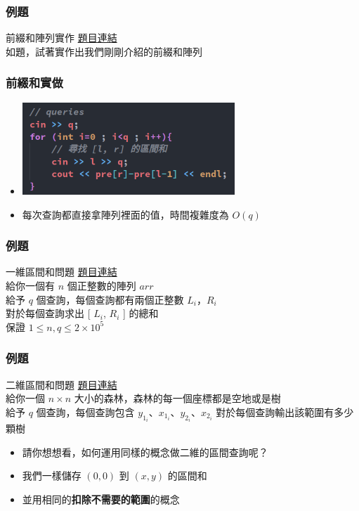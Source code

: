 \documentclass[mathserif]{beamer}
\begin{document}
\begin{frame}
    \frametitle{例題}
    \begin{block}{前綴和陣列實作}
        \href{https://zerojudge.tw/ShowProblem?problemid=e339}{題目連結}\\
        如題，試著實作出我們剛剛介紹的前綴和陣列
    \end{block}
\end{frame}

\begin{frame}
    \frametitle{前綴和實做}
    \begin{itemize}
        \item \includegraphics[width=8.0cm]{img/6-5.png}
        \item 每次查詢都直接拿陣列裡面的值，時間複雜度為 $O(q)$
    \end{itemize}
\end{frame}

\begin{frame}
    \frametitle{例題}
    \begin{block}{一維區間和問題}
        \href{https://cses.fi/problemset/task/1646}{題目連結}\\
        給你一個有 $n$ 個正整數的陣列 $arr$\\
        給予 $q$ 個查詢，每個查詢都有兩個正整數 $L_i$，$R_i$\\
        對於每個查詢求出 [ $L_i$, $R_i$ ] 的總和\\

        保證 $1 \leq n, q \leq 2 \times 10^5$
    \end{block}
\end{frame}

\begin{frame}
    \frametitle{例題}
    \begin{block}{二維區間和問題}
        \href{https://cses.fi/problemset/task/1652}{題目連結}\\
        給你一個 $n \times n$ 大小的森林，森林的每一個座標都是空地或是樹\\
        給予 $q$ 個查詢，每個查詢包含 $y_{1_i}$、$x_{1_i}$、$y_{2_i}$、$x_{2_i}$
        對於每個查詢輸出該範圍有多少顆樹
    \end{block}
    \begin{itemize}
        \item 請你想想看，如何運用同樣的概念做二維的區間查詢呢？
        \item<2-> 我們一樣儲存 $(0, 0)$ 到 $(x, y)$ 的區間和
        \item<2-> 並用相同的\textbf{扣除不需要的範圍}的概念
    \end{itemize}
\end{frame}
\end{document}
